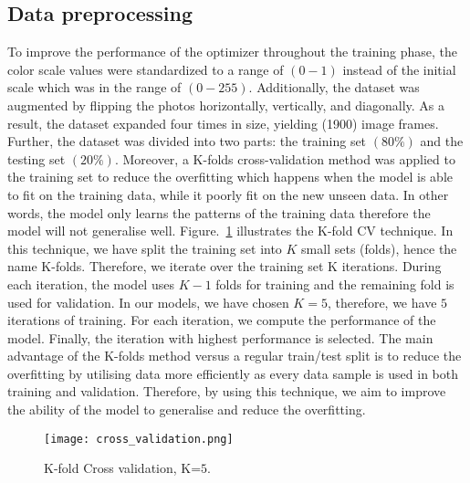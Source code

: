 \subsection{Data preprocessing}
To improve the performance of the optimizer throughout the training phase, the color scale values were standardized to a range of \((0-1)\) instead of the initial scale which was in the range of \((0 - 255)\).
Additionally, the dataset was augmented by flipping the photos horizontally, vertically, and diagonally.
As a result, the dataset expanded four times in size, yielding (1900) image frames.
Further, the dataset was divided into two parts: the training set $(80\%)$ and the testing set $(20\%)$.
Moreover, a K-folds cross-validation method was applied to the training set to reduce the overfitting which happens when the model is able to fit on the training data, while it poorly fit on the new unseen data.
In other words, the model only learns the patterns of the training data therefore the model will not generalise well. 
Figure.~\ref{fig:Cross_validation} illustrates the K-fold CV technique.
In this technique, we have split the training set into \(K\) small sets (folds), hence the name K-folds. 
Therefore, we iterate over the training set K iterations.
During each iteration, the model uses \(K-1\) folds for training and the remaining fold is used for validation. 
In our models, we have chosen \(K=5\), therefore, we have \(5\) iterations of training. 
For each iteration, we compute the performance of the model.
Finally, the iteration with highest performance is selected.
The main advantage of the K-folds method versus a regular train/test split is to reduce the overfitting by utilising data more efficiently as every data sample is used in both training and validation. 
Therefore, by using this technique, we aim to improve the ability of the model to generalise and reduce the overfitting.
\begin{figure}
	\centering
	\texttt{[image: cross\_validation.png]}
	\caption{K-fold Cross validation, K=\(5\).}
	\label{fig:Cross_validation}
\end{figure}

